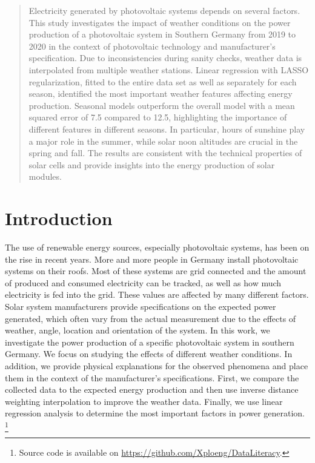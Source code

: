 \documentclass{article}
\begin{document}
\printAffiliationsAndNotice{\icmlEqualContribution} %

\begin{abstract}
Electricity generated by photovoltaic systems depends on several factors. This study investigates the impact of weather conditions on the power production of a photovoltaic system in Southern Germany from 2019 to 2020 in the context of photovoltaic technology and manufacturer's specification. Due to inconsistencies during sanity checks, weather data is interpolated from multiple weather stations. Linear regression with LASSO regularization, fitted to the entire data set as well as separately for each season, identified the most important weather features affecting energy production. Seasonal models outperform the overall model with a mean squared error of 7.5 compared to 12.5, highlighting the importance of different features in different seasons. In particular, hours of sunshine play a major role in the summer, while solar noon altitudes are crucial in the spring and fall. The results are consistent with the technical properties of solar cells and provide insights into the energy production of solar modules. 
\end{abstract}
\section{Introduction}\label{sec:intro}
The use of renewable energy sources, especially photovoltaic systems, has been on the rise in recent years. More and more people in Germany install photovoltaic systems on their roofs. 
Most of these systems are grid connected and the amount of produced and consumed electricity can be tracked, as well as how much electricity is fed into the grid. These values are affected by many different factors. Solar system manufacturers provide specifications on the expected power generated, which often vary from the actual measurement due to the effects of weather, angle, location and orientation of the system. In this work, we investigate the power production of a specific photovoltaic system in southern Germany. We focus on studying the effects of different weather conditions. In addition, we provide physical explanations for the observed phenomena and place them in the context of the manufacturer's specifications.
First, we compare the collected data to the expected energy production and then use inverse distance weighting interpolation to improve the weather data. Finally, we use linear regression analysis to determine the most important factors in power generation. \footnote{Source code is available on \newline \href{https://github.com/Xploeng/DataLiteracy} {\qquad https://github.com/Xploeng/DataLiteracy}.}
\end{document}
